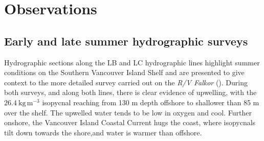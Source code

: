 \documentclass[draft]{agujournal2019}
\begin{document}
\section{Observations}
\label{sec:Observations}

\subsection{Early and late summer hydrographic surveys}

Hydrographic sections along the LB and LC hydrographic lines highlight summer conditions on the Southern Vancouver Island Shelf and are presented to give context to the more detailed survey carried out on the \emph{R/V Falkor} ().  During both surveys, and along both lines, there is clear evidence of upwelling, with the $26.4\ \mathrm{kg\,m^{-3}}$ isopycnal reaching from 130 m depth offshore to shallower than 85 m over the shelf.  The upwelled water tends to be low in oxygen and cool. Further onshore, the Vancouver Island Coastal Current hugs the coast, where isopycnals tilt down towards the shore,and water is warmer than offshore.
\end{document}
